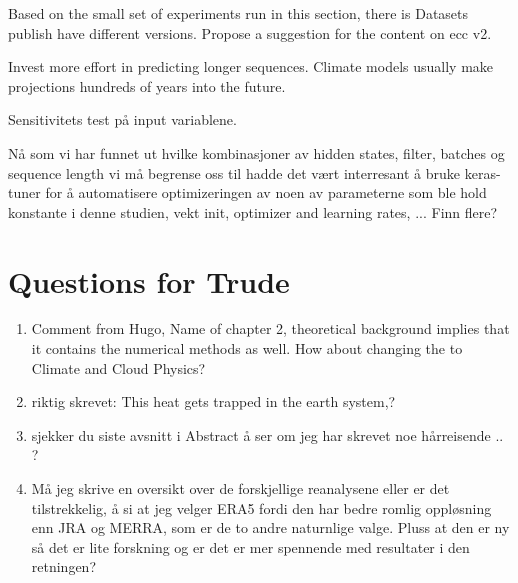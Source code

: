 Based on the small set of experiments run in this section, there is 
Datasets publish have different versions. Propose a suggestion for the content on \acrshort{ecc} v2.

Invest more effort in predicting longer sequences. Climate models usually make projections hundreds of years into the future.

Sensitivitets test på input variablene.


Nå som vi har funnet ut hvilke kombinasjoner av hidden states, filter, batches og sequence length vi må begrense oss til hadde det vært interresant å bruke keras-tuner for å automatisere optimizeringen av noen av parameterne som ble hold konstante i denne studien, vekt init, optimizer and learning rates, ... Finn flere?

\section{Questions for Trude}

\begin{enumerate}
    \item Comment from Hugo, Name of chapter 2, theoretical background implies that it contains the numerical methods as well. How about changing the to Climate and Cloud Physics?
    \item riktig skrevet: This heat gets trapped in the earth system,?
    \item sjekker du siste avsnitt i Abstract å ser om jeg har skrevet noe hårreisende .. ?
    \item Må jeg skrive en oversikt over de forskjellige reanalysene eller er det tilstrekkelig, å si at jeg velger ERA5 fordi den har bedre romlig oppløsning enn JRA og MERRA, som er de to andre naturnlige valge. Pluss at den er ny så det er lite forskning og er det er mer spennende med resultater i den retningen?
\end{enumerate}